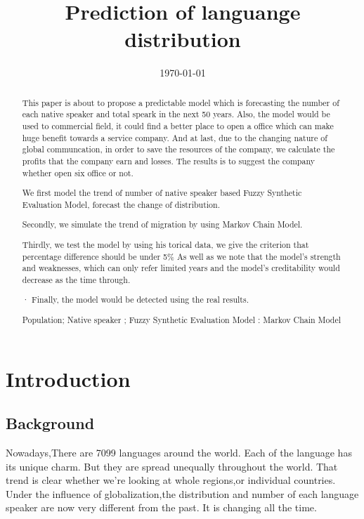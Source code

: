 \documentclass{mcmthesis}
\title{Prediction of languange distribution}
\date{\today}
\begin{document}
\begin{abstract}
\qquad This paper is about to propose a predictable model which is forecasting the number of each native speaker and total speark in the next 50 years.
Also, the model would be used to commercial field, it could find a better place to open a office which can make huge benefit towards a service company.
And at last, due to the changing nature of global communcation, in order to save the resources of the company, we calculate the profits that the company earn and losses.
The results is to suggest the company whether open six office or not.


We first model the trend of number of native speaker based Fuzzy Synthetic Evaluation Model, forecast the change of distribution.

Secondly, we simulate the trend of migration by using Markov Chain Model. 

Thirdly, we test the model by using his torical data, we give the criterion that percentage difference should be under 5\%
As well as we note that the model's strength and weaknesses, which can only refer limited years and the model's creditability would decrease as the time through.

·
Finally, the model would be detected using the real results.

\begin{keywords}
Population; Native speaker ; Fuzzy Synthetic Evaluation Model : Markov Chain Model
\end{keywords}
\end{abstract}
\maketitle
\tableofcontents
\section{Introduction}
\subsection{Background}
\qquad Nowadays,There are 7099 languages around the world. Each of the language has its unique charm.
But they are spread unequally throughout the world. 
That trend is clear whether we’re looking at whole regions,or individual countries.
Under the influence of globalization,the distribution and number of each language speaker are now very different from the past. 
It is changing all the time.
\cite{No-of-languages}
\end{document}
